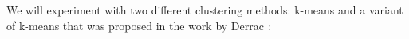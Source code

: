 








We will experiment with two different clustering methods: k-means and a variant of k-means that was proposed in the work by Derrac \cite{Derrac2015}:

